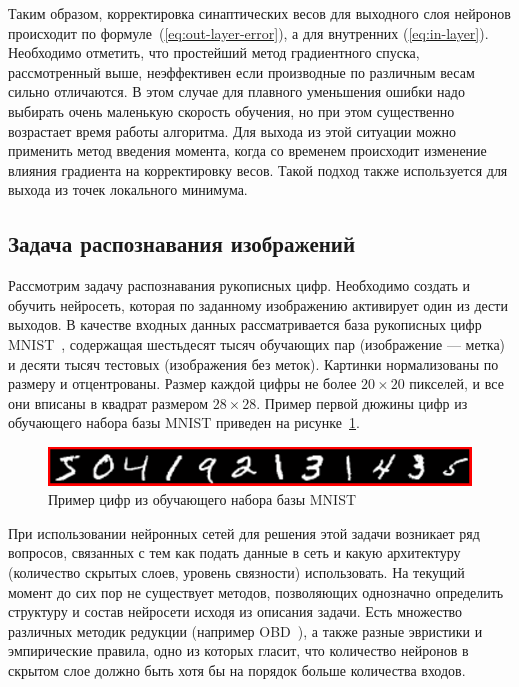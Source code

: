 \documentclass[a4paper,14pt]{extarticle} %
\begin{document}
Таким образом, корректировка синаптических весов для выходного слоя нейронов происходит по формуле~(\ref{eq:out-layer-error}), а для внутренних (\ref{eq:in-layer}). Необходимо отметить, что простейший метод градиентного спуска, рассмотренный выше, неэффективен если производные по различным весам сильно отличаются. В этом случае для плавного уменьшения ошибки надо выбирать очень маленькую скорость обучения, но при этом существенно возрастает время работы алгоритма. Для выхода из этой ситуации можно применить метод введения момента, когда со временем происходит изменение влияния градиента на корректировку весов. Такой подход также используется для выхода из точек локального минимума.

\subsection{Задача распознавания изображений}
\hspace{\parindent} Рассмотрим задачу распознавания рукописных цифр. Необходимо создать и обучить нейросеть, которая по заданному изображению активирует один из дести выходов. В качестве входных данных рассматривается база рукописных цифр MNIST~\cite{lecun1998mnist}, содержащая шестьдесят тысяч обучающих пар (изображение --- метка) и десяти тысяч тестовых (изображения без меток). Картинки нормализованы по размеру и отцентрованы. Размер каждой цифры не более $20\times20$ пикселей, и все они вписаны в квадрат размером $28\times28$. Пример первой дюжины цифр из обучающего набора базы MNIST приведен на рисунке~\ref{fig:mnist}.

\begin{figure}[h]
\centering
\includegraphics[width=0.7\linewidth]{mnist}
\caption{Пример цифр из обучающего набора базы MNIST}
\label{fig:mnist}
\end{figure}

При использовании нейронных сетей для решения этой задачи возникает ряд вопросов, связанных с тем как подать данные в сеть и какую архитектуру (количество скрытых слоев, уровень связности) использовать. На текущий момент до сих пор не существует методов, позволяющих однозначно определить структуру и состав нейросети исходя из описания задачи. Есть множество различных методик редукции (например OBD~\cite{chauvin1989advances}), а также разные эвристики и эмпирические правила, одно из которых гласит, что количество нейронов в скрытом слое должно быть хотя бы на порядок больше количества входов.
\end{document}
